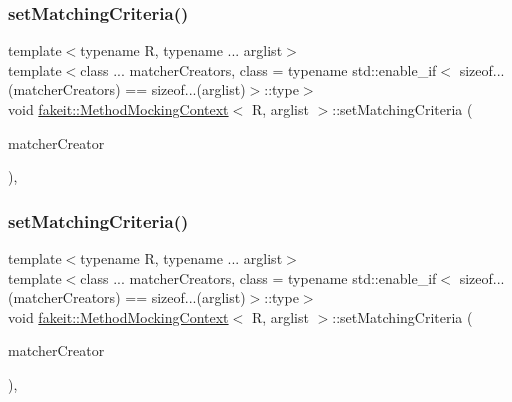\mbox{\label{classfakeit_1_1MethodMockingContext_ab6bf85e9f9f5e5eeb2766ec487a42e20}} 
\subsubsection{\texorpdfstring{setMatchingCriteria()}{setMatchingCriteria()}\hspace{0.1cm}{\footnotesize\ttfamily [13/27]}}
{\footnotesize\ttfamily template$<$typename R, typename ... arglist$>$ \\
template$<$class ... matcher\+Creators, class  = typename std\+::enable\+\_\+if$<$                sizeof...(matcher\+Creators) == sizeof...(arglist)$>$\+::type$>$ \\
void \mbox{\hyperlink{classfakeit_1_1MethodMockingContext}{fakeit\+::\+Method\+Mocking\+Context}}$<$ R, arglist $>$\+::set\+Matching\+Criteria (\begin{DoxyParamCaption}\item[{const matcher\+Creators \&...}]{matcher\+Creator }\end{DoxyParamCaption})\hspace{0.3cm}{\ttfamily [inline]}, {\ttfamily [protected]}}

\mbox{\label{classfakeit_1_1MethodMockingContext_ab6bf85e9f9f5e5eeb2766ec487a42e20}} 
\subsubsection{\texorpdfstring{setMatchingCriteria()}{setMatchingCriteria()}\hspace{0.1cm}{\footnotesize\ttfamily [14/27]}}
{\footnotesize\ttfamily template$<$typename R, typename ... arglist$>$ \\
template$<$class ... matcher\+Creators, class  = typename std\+::enable\+\_\+if$<$                sizeof...(matcher\+Creators) == sizeof...(arglist)$>$\+::type$>$ \\
void \mbox{\hyperlink{classfakeit_1_1MethodMockingContext}{fakeit\+::\+Method\+Mocking\+Context}}$<$ R, arglist $>$\+::set\+Matching\+Criteria (\begin{DoxyParamCaption}\item[{const matcher\+Creators \&...}]{matcher\+Creator }\end{DoxyParamCaption})\hspace{0.3cm}{\ttfamily [inline]}, {\ttfamily [protected]}}

